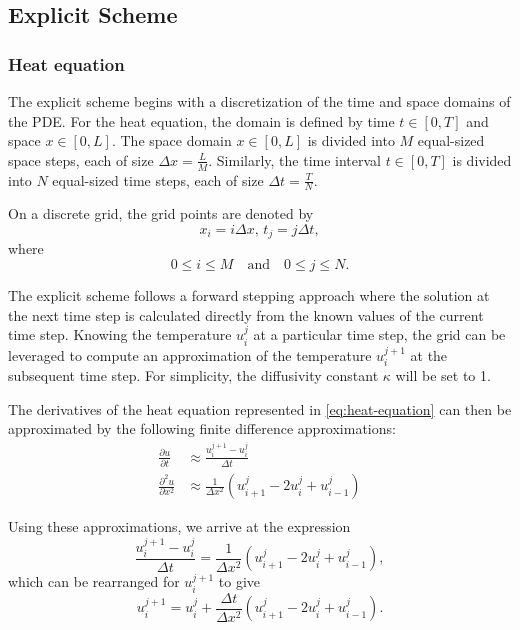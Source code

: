 \subsection{Explicit Scheme}\label{sec:explicit}

\subsubsection{Heat equation}
The explicit scheme begins with a discretization of the time and space domains of the PDE.
For the heat equation, the domain is defined by time $t \in [0, T]$ and space $x \in [0,L]$. The space domain $x \in [0,L]$ is divided into $M$ equal-sized space steps, each of size ${\Delta x} = \frac{L}{M}$. Similarly, the time interval $t \in [0, T]$ is divided into $N$ equal-sized time steps, each of size ${\Delta t} = \frac{T}{N}$.

On a discrete grid, the grid points are denoted by
\[
x_i = i {\Delta x},\, t_j = j {\Delta t},
\]
where
\[
0 \leq i \leq M \quad \text{and} \quad 0 \leq j \leq N.
\]

The explicit scheme follows a forward stepping approach where the solution at the next time step is calculated directly from
the known values of the current time step. Knowing the temperature $u_i^j$ at a particular time step, the grid can be leveraged to compute an
approximation of the temperature $u_i^{j+1}$ at the subsequent time step. For simplicity, the diffusivity constant $\kappa$ will be set to 1.

The derivatives of the heat equation represented in \eqref{eq:heat-equation} can then be approximated by the following finite difference approximations:
\begin{align}
    \frac{\partial u}{\partial t} &\approx \frac{u_i^{j+1} - u_i^{j}}{\Delta t} \tag{Time Derivative} \\
    \frac{\partial^2 u}{\partial x^2} &\approx \frac {1}{\Delta x^2} (u_{i+1}^j - 2u_i^j + u_{i-1}^j) \tag{Spatial Second Derivative}
\end{align}

Using these approximations, we arrive at the expression
\begin{equation}
    \frac{u_i^{j+1} - u_i^{j}}{\Delta t} = \frac {1}{\Delta x^2} (u_{i+1}^j - 2u_i^j + u_{i-1}^j),
\end{equation}
which can be rearranged for $u_i^{j+1}$ to give
\begin{equation}
    u_i^{j+1} = u_i^{j} + \frac {\Delta t}{\Delta x^2} (u_{i+1}^j - 2u_i^j + u_{i-1}^j).
\end{equation}

